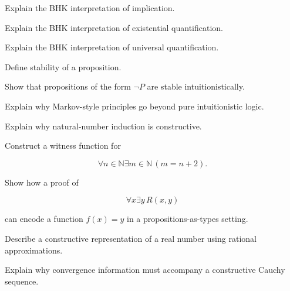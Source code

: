 \begin{exercise}[3]
Explain the BHK interpretation of implication.
\end{exercise}

\begin{exercise}[3]
Explain the BHK interpretation of existential quantification.
\end{exercise}

\begin{exercise}[3]
Explain the BHK interpretation of universal quantification.
\end{exercise}

\begin{exercise}[3]
Define stability of a proposition.
\end{exercise}

\begin{exercise}[3]
Show that propositions of the form \(\neg P\) are stable intuitionistically.
\end{exercise}

\begin{exercise}[3]
Explain why Markov-style principles go beyond pure intuitionistic logic.
\end{exercise}

\begin{exercise}[2]
Explain why natural-number induction is constructive.
\end{exercise}

\begin{exercise}[2]
Construct a witness function for

\[
\forall n\in\mathbb{N}
\exists m\in\mathbb{N}
\,
(m=n+2).
\]
\end{exercise}

\begin{exercise}[3]
Show how a proof of

\[
\forall x\exists y\,R(x,y)
\]

can encode a function \(f(x)=y\) in a propositions-as-types setting.
\end{exercise}

\begin{exercise}[2]
Describe a constructive representation of a real number using rational
approximations.
\end{exercise}

\begin{exercise}[3]
Explain why convergence information must accompany a constructive Cauchy
sequence.
\end{exercise}

